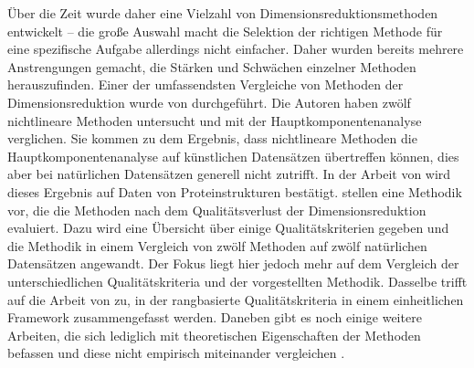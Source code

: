 Über die Zeit wurde daher eine Vielzahl von Dimensionsreduktionsmethoden entwickelt \parencite[siehe z.B.][]{Lee.2007} -- die große Auswahl macht die Selektion der richtigen Methode für
eine spezifische Aufgabe allerdings nicht einfacher. Daher wurden bereits mehrere Anstrengungen
gemacht, die Stärken und Schwächen einzelner Methoden herauszufinden. Einer der umfassendsten
Vergleiche von Methoden der Dimensionsreduktion wurde von \Textcite{vanderMaaten.2009}
durchgeführt. Die Autoren haben zwölf nichtlineare Methoden untersucht und mit der
Hauptkomponentenanalyse verglichen. Sie kommen zu dem Ergebnis, dass nichtlineare Methoden die
Hauptkomponentenanalyse auf künstlichen Datensätzen übertreffen können, dies aber bei natürlichen
Datensätzen generell nicht zutrifft. In der Arbeit von \textcite{RohanPandit.2016} wird dieses
Ergebnis auf Daten von Proteinstrukturen bestätigt. \Textcite{Gracia.2014} stellen eine Methodik
vor, die die Methoden nach dem Qualitätsverlust der Dimensionsreduktion evaluiert. Dazu wird eine
Übersicht über einige Qualitätskriterien gegeben und die Methodik in einem Vergleich von zwölf
Methoden auf zwölf natürlichen Datensätzen angewandt. Der Fokus liegt hier jedoch mehr auf dem
Vergleich der unterschiedlichen Qualitätskriteria und der vorgestellten Methodik. Dasselbe trifft
auf die Arbeit von \textcite{Lee.2009} zu, in der rangbasierte Qualitätskriteria in einem
einheitlichen Framework zusammengefasst werden. Daneben gibt es noch einige weitere Arbeiten, die
sich lediglich mit theoretischen Eigenschaften der Methoden befassen und diese nicht empirisch
miteinander vergleichen \parencites{Cunningham.2014}{Sorzano.2014}{Lee.2007}{Sarveniazi.2014}{Burges.2009b}.

